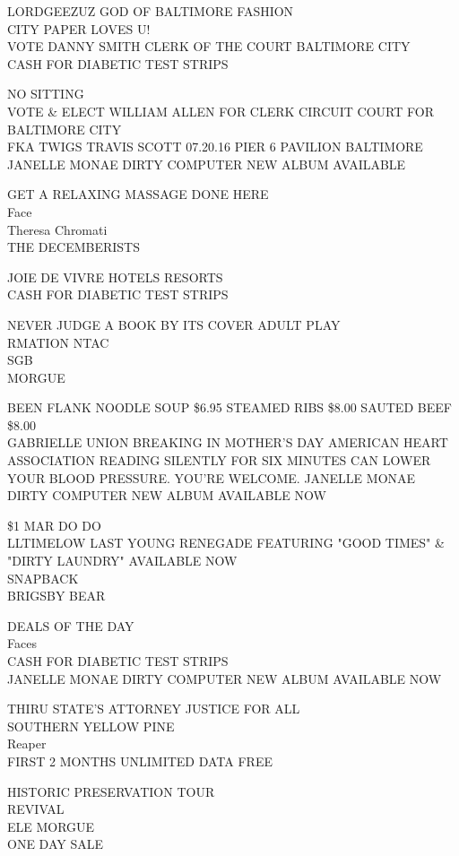 \documentclass[10pt,letterpaper]{article}
\begin{document}
LORDGEEZUZ GOD OF BALTIMORE FASHION\\
CITY PAPER LOVES U!\\
VOTE DANNY SMITH CLERK OF THE COURT BALTIMORE CITY\\
CASH FOR DIABETIC TEST STRIPS

NO SITTING\\
VOTE \& ELECT WILLIAM ALLEN FOR CLERK CIRCUIT COURT FOR BALTIMORE CITY\\
FKA TWIGS TRAVIS SCOTT 07.20.16 PIER 6 PAVILION BALTIMORE\\
JANELLE MONAE DIRTY COMPUTER NEW ALBUM AVAILABLE

GET A RELAXING MASSAGE DONE HERE\\
Face\\
Theresa Chromati\\
THE DECEMBERISTS

JOIE DE VIVRE HOTELS RESORTS\\
CASH FOR DIABETIC TEST STRIPS

NEVER JUDGE A BOOK BY ITS COVER ADULT PLAY\\
RMATION NTAC\\
SGB\\
MORGUE

BEEN FLANK NOODLE SOUP \$6.95 STEAMED RIBS \$8.00 SAUTED BEEF \$8.00\\
GABRIELLE UNION BREAKING IN MOTHER'S DAY AMERICAN HEART ASSOCIATION READING SILENTLY FOR SIX MINUTES CAN LOWER YOUR BLOOD PRESSURE.  YOU'RE WELCOME. JANELLE MONAE DIRTY COMPUTER NEW ALBUM AVAILABLE NOW

\$1 MAR DO DO\\
LLTIMELOW LAST YOUNG RENEGADE FEATURING "GOOD TIMES" \& "DIRTY LAUNDRY" AVAILABLE NOW\\
SNAPBACK\\
BRIGSBY BEAR

DEALS OF THE DAY\\
Faces\\
CASH FOR DIABETIC TEST STRIPS\\
JANELLE MONAE DIRTY COMPUTER NEW ALBUM AVAILABLE NOW

THIRU STATE'S ATTORNEY JUSTICE FOR ALL\\
SOUTHERN YELLOW PINE\\
Reaper\\
FIRST 2 MONTHS UNLIMITED DATA FREE

HISTORIC PRESERVATION TOUR\\
REVIVAL\\
ELE MORGUE\\
ONE DAY SALE
\end{document}
